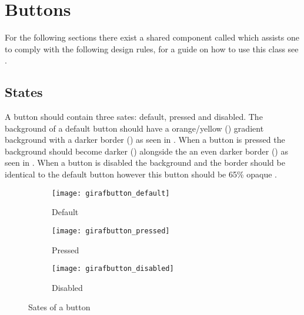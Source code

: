 
\chapter{Buttons}
\label{cha:buttons}

For the following sections there exist a shared component called  which assists one to comply with the following design rules, for a guide on how to use this class see .

\section{States}
\label{sec:button_states}

A button should contain three sates: default, pressed and disabled. The background of a default button should have a orange/yellow () gradient background with a darker border () as seen in . When a button is pressed the background should become darker () alongside the an even darker border () as seen in . When a button is disabled the background and the border should be identical to the default button however this button should be 65\% opaque .

\begin{figure}[!htbp]
    \centering

    \begin{subfigure}[t]{0.3\textwidth}
    	\centering
        \texttt{[image: girafbutton\_default]}
        \caption{Default}
        \label{fig:girafbutton_default}
    \end{subfigure}
    \hspace{1em} 
    \begin{subfigure}[t]{0.3\textwidth}
    	\centering
        \texttt{[image: girafbutton\_pressed]}
        \caption{Pressed}
        \label{fig:girafbutton_pressed}
    \end{subfigure}
    \hspace{1em} 
    \begin{subfigure}[t]{0.3\textwidth}
    	\centering
        \texttt{[image: girafbutton\_disabled]}
        \caption{Disabled}
        \label{fig:girafbutton_disabled}
    \end{subfigure}
    
    \caption{Sates of a button}
    \label{fig:girafbutton_states}
\end{figure}

